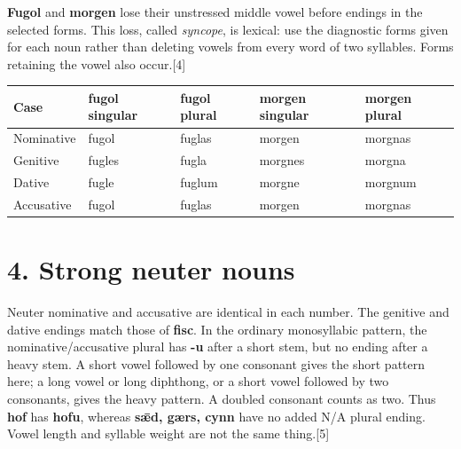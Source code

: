 \textbf{Fugol} and \textbf{morgen} lose their unstressed middle vowel before endings in the selected forms. This loss, called \emph{syncope}, is lexical: use the diagnostic forms given for each noun rather than deleting vowels from every word of two syllables. Forms retaining the vowel also occur.[4]

\par\begingroup
\fontsize{10.5}{13.2}\selectfont
\setlength{\LTleft}{0pt}\setlength{\LTright}{\fill}
\noindent
\begin{tabular}{@{}>{\raggedright\arraybackslash}p{22.0mm}>{\raggedright\arraybackslash}p{22.688mm}>{\raggedright\arraybackslash}p{22.688mm}>{\raggedright\arraybackslash}p{22.688mm}>{\raggedright\arraybackslash}p{22.688mm}@{}}
\toprule
\textbf{Case} & \textbf{fugol singular} & \textbf{fugol plural} & \textbf{morgen singular} & \textbf{morgen plural} \\
\midrule
Nominative & fugol & fuglas & morgen & morgnas \\
Genitive & fugles & fugla & morgnes & morgna \\
Dative & fugle & fuglum & morgne & morgnum \\
Accusative & fugol & fuglas & morgen & morgnas \\
\bottomrule
\end{tabular}
\par\endgroup

\section*{4. Strong neuter nouns}

Neuter nominative and accusative are identical in each number. The genitive and dative endings match those of \textbf{fisc}. In the ordinary monosyllabic pattern, the nominative/\allowbreak{}accusative plural has \textbf{-u} after a short stem, but no ending after a heavy stem. A short vowel followed by one consonant gives the short pattern here; a long vowel or long diphthong, or a short vowel followed by two consonants, gives the heavy pattern. A doubled consonant counts as two. Thus \textbf{hof} has \textbf{hofu}, whereas \textbf{sǣd, gærs, cynn} have no added N/\allowbreak{}A plural ending. Vowel length and syllable weight are not the same thing.[5]

